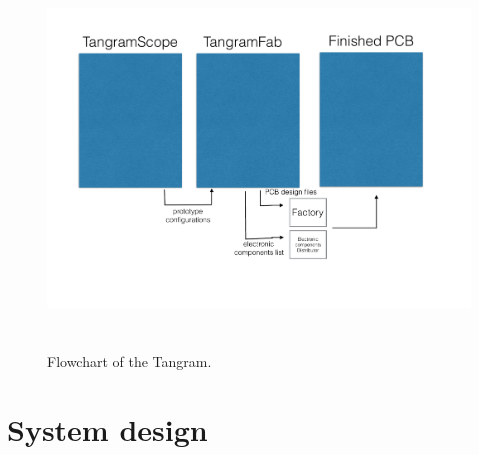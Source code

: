 

\begin{figure}[ht]
\begin{center}
\includegraphics[height=10cm]{image/tan/flowchart.pdf}
\caption{Flowchart of the Tangram.}
\label{fig:flowchart}
\end{center}
\end{figure}

\section{System design}

